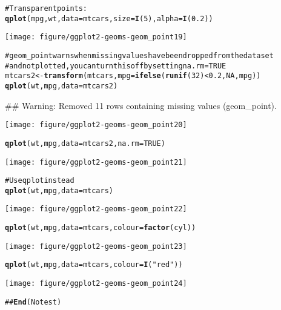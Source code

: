 \documentclass[a4paper,titlepage]{tufte-handout}\usepackage{graphicx, color}
\makeatletter
\def\maxwidth{ %
  \ifdim\Gin@nat@width>\linewidth
    \linewidth
  \else
    \Gin@nat@width
  \fi
}
\newcommand{\hlfunctioncall}[1]{\textcolor[rgb]{0.501960784313725,0,0.329411764705882}{\textbf{#1}}}%
\newcommand{\hlstring}[1]{\textcolor[rgb]{0.6,0.6,1}{#1}}%
\newcommand{\hlcomment}[1]{\textcolor[rgb]{0.180392156862745,0.6,0.341176470588235}{#1}}%
\newenvironment{kframe}{%
 \def\at@end@of@kframe{}%
 \ifinner\ifhmode%
  \def\at@end@of@kframe{\end{minipage}}%
  \begin{minipage}{\columnwidth}%
 \fi\fi%
 \def\FrameCommand##1{\hskip\@totalleftmargin \hskip-\fboxsep
 \colorbox{shadecolor}{##1}\hskip-\fboxsep
     \hskip-\linewidth \hskip-\@totalleftmargin \hskip\columnwidth}%
 \MakeFramed {\advance\hsize-\width
   \@totalleftmargin\z@ \linewidth\hsize
   \@setminipage}}%
 {\par\unskip\endMakeFramed%
 \at@end@of@kframe}
\newenvironment{knitrout}{}{} %
\makeatother
\begin{document}
\begin{knitrout}
\begin{kframe}
\begin{alltt}
\hlcomment{# Transparent points:}
\hlfunctioncall{qplot}(mpg, wt, data = mtcars, size = \hlfunctioncall{I}(5), alpha = \hlfunctioncall{I}(0.2))
\end{alltt}
\end{kframe}\texttt{[image: figure/ggplot2-geoms-geom\_point19]} \begin{kframe}\begin{alltt}
\hlcomment{# geom_point warns when missing values have been dropped from the data set}
\hlcomment{# and not plotted, you can turn this off by setting na.rm = TRUE}
mtcars2 <- \hlfunctioncall{transform}(mtcars, mpg = \hlfunctioncall{ifelse}(\hlfunctioncall{runif}(32) < 0.2, NA, mpg))
\hlfunctioncall{qplot}(wt, mpg, data = mtcars2)
\end{alltt}


{\ttfamily\noindent\textcolor{warningcolor}{\#\# Warning: Removed 11 rows containing missing values (geom\_point).}}\end{kframe}\texttt{[image: figure/ggplot2-geoms-geom\_point20]} \begin{kframe}\begin{alltt}
\hlfunctioncall{qplot}(wt, mpg, data = mtcars2, na.rm = TRUE)
\end{alltt}
\end{kframe}\texttt{[image: figure/ggplot2-geoms-geom\_point21]} \begin{kframe}\begin{alltt}
\hlcomment{# Use qplot instead}
\hlfunctioncall{qplot}(wt, mpg, data = mtcars)
\end{alltt}
\end{kframe}\texttt{[image: figure/ggplot2-geoms-geom\_point22]} \begin{kframe}\begin{alltt}
\hlfunctioncall{qplot}(wt, mpg, data = mtcars, colour = \hlfunctioncall{factor}(cyl))
\end{alltt}
\end{kframe}\texttt{[image: figure/ggplot2-geoms-geom\_point23]} \begin{kframe}\begin{alltt}
\hlfunctioncall{qplot}(wt, mpg, data = mtcars, colour = \hlfunctioncall{I}(\hlstring{"red"}))
\end{alltt}
\end{kframe}\texttt{[image: figure/ggplot2-geoms-geom\_point24]} \begin{kframe}\begin{alltt}
\hlcomment{## \hlfunctioncall{End}(No test)}
\end{alltt}
\end{kframe}
\end{knitrout}
\end{document}
